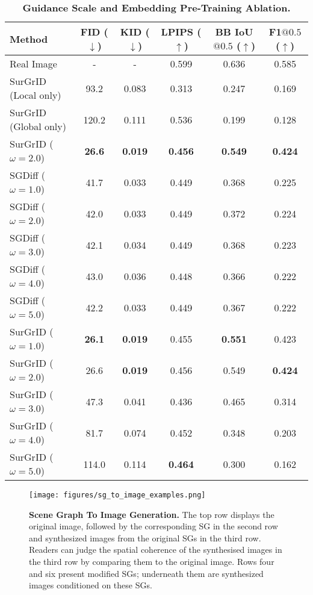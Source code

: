 \begin{table}[htbp]
    \centering
    \caption{\textbf{Guidance Scale and Embedding Pre-Training Ablation.}}
    \begin{tabular}{l|ccc|cc}
         \textbf{Method} & \textbf{FID} ($\downarrow$) & \textbf{KID} ($\downarrow$) & \textbf{LPIPS} ($\uparrow$) & \textbf{BB IoU$@0.5$} ($\uparrow$) & \textbf{F1$@0.5$} ($\uparrow$)\\
         \hline
         Real Image & - & - & 0.599 & 0.636 & 0.585\\
         \hline
         SurGrID (Local only) & 93.2 & 0.083 & 0.313 & 0.247 & 0.169\\
         SurGrID (Global only) & 120.2 & 0.111 & 0.536 & 0.199 & 0.128\\
         SurGrID ($\omega=2.0$) & \textbf{26.6} & \textbf{0.019} & \textbf{0.456} & \textbf{0.549} & \textbf{0.424}\\
         \hline
         SGDiff \cite{yang2022diffusion} ($\omega=1.0$) & 41.7 & 0.033 & 0.449 & 0.368 & 0.225\\
         SGDiff \cite{yang2022diffusion} ($\omega=2.0$) & 42.0 & 0.033 & 0.449 & 0.372 & 0.224\\
         SGDiff \cite{yang2022diffusion} ($\omega=3.0$) & 42.1 & 0.034 & 0.449 & 0.368 & 0.223\\
         SGDiff \cite{yang2022diffusion} ($\omega=4.0$) & 43.0 & 0.036 & 0.448 & 0.366 & 0.222\\
         SGDiff \cite{yang2022diffusion} ($\omega=5.0$) & 42.2 & 0.033 & 0.449 & 0.367 & 0.222\\
         \hline
         SurGrID ($\omega=1.0$) & \textbf{26.1} & \textbf{0.019} & 0.455 & \textbf{0.551} & 0.423\\
         SurGrID ($\omega=2.0$) & 26.6 & \textbf{0.019} & 0.456 & 0.549 & \textbf{0.424}\\
         SurGrID ($\omega=3.0$) & 47.3 & 0.041 & 0.436 & 0.465 & 0.314\\
         SurGrID ($\omega=4.0$) & 81.7 & 0.074 & 0.452 & 0.348 & 0.203\\
         SurGrID ($\omega=5.0$) & 114.0 & 0.114 & \textbf{0.464} & 0.300 & 0.162\\
    \end{tabular}
    \label{tab:ablation}
\end{table}

\begin{figure}
    \centering
    \texttt{[image: figures/sg\_to\_image\_examples.png]}
    \caption{\textbf{Scene Graph To Image Generation.} The top row displays the original image, followed by the corresponding SG in the second row and synthesized images from the original SGs in the third row. Readers can judge the spatial coherence of the synthesised images in the third row by comparing them to the original image. Rows four and six present modified SGs; underneath them are synthesized images conditioned on these SGs.}
    \label{fig:qual}
\end{figure}

